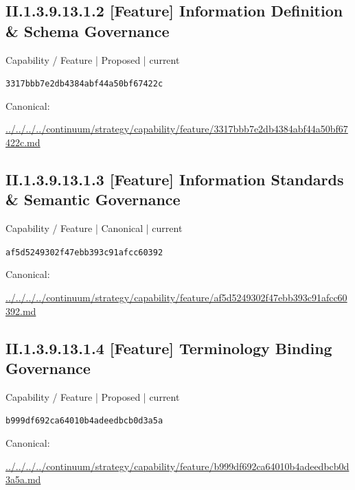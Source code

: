 \documentclass[10pt,a4paper]{article}
\begin{document}
\subsection*{II.1.3.9.13.1.2 [Feature] Information Definition \& Schema Governance}
\label{element-3317bbb7e2db4384abf44a50bf67422c}
{\small Capability / Feature | Proposed | current}\par
\texttt{3317bbb7e2db4384abf44a50bf67422c}\par
Canonical: \par
{\footnotesize\url{../../../../continuum/strategy/capability/feature/3317bbb7e2db4384abf44a50bf67422c.md}}\par
\subsection*{II.1.3.9.13.1.3 [Feature] Information Standards \& Semantic Governance}
\label{element-af5d5249302f47ebb393c91afcc60392}
{\small Capability / Feature | Canonical | current}\par
\texttt{af5d5249302f47ebb393c91afcc60392}\par
Canonical: \par
{\footnotesize\url{../../../../continuum/strategy/capability/feature/af5d5249302f47ebb393c91afcc60392.md}}\par
\subsection*{II.1.3.9.13.1.4 [Feature] Terminology Binding Governance}
\label{element-b999df692ca64010b4adeedbcb0d3a5a}
{\small Capability / Feature | Proposed | current}\par
\texttt{b999df692ca64010b4adeedbcb0d3a5a}\par
Canonical: \par
{\footnotesize\url{../../../../continuum/strategy/capability/feature/b999df692ca64010b4adeedbcb0d3a5a.md}}\par
\end{document}
